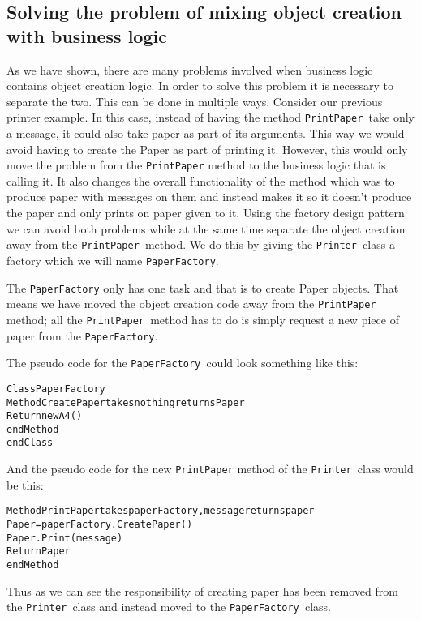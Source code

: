 \subsection*{Solving the problem of mixing object creation with business logic}

As we have shown, there are many problems involved when business logic
contains object creation logic. In order to solve this problem it
is necessary to separate the two. This can be done in multiple ways.
Consider our previous printer example. In this case, instead of having
the method \texttt{PrintPaper }take only a message, it could also
take paper as part of its arguments. This way we would avoid having
to create the Paper as part of printing it. However, this would only
move the problem from the \texttt{PrintPaper} method to the business
logic that is calling it. It also changes the overall functionality
of the method which was to produce paper with messages on them and
instead makes it so it doesn\textquoteright{}t produce the paper and
only prints on paper given to it. Using the factory design pattern
we can avoid both problems while at the same time separate the object
creation away from the \texttt{PrintPaper }method. We do this by giving
the \texttt{Printer }class a factory which we will name \texttt{PaperFactory}.

The \texttt{PaperFactory} only has one task and that is to create
Paper objects. That means we have moved the object creation code away
from the \texttt{PrintPaper }method; all the \texttt{PrintPaper }method
has to do is simply request a new piece of paper from the \texttt{PaperFactory}.

The pseudo code for the \texttt{PaperFactory }could look something
like this:

\begin{alltt}
Class PaperFactory 	
    Method CreatePaper takes nothing returns Paper
        Return new A4() 
    endMethod 
endClass
\end{alltt}

And the pseudo code for the new \texttt{PrintPaper} method of the
\texttt{Printer }class would be this:

\begin{alltt}
Method PrintPaper takes paperFactory, message returns paper
    Paper = paperFactory.CreatePaper()
    Paper.Print(message) 	
    Return Paper 
endMethod	
\end{alltt}

Thus as we can see the responsibility of creating paper has been removed
from the \texttt{Printer }class and instead moved to the \texttt{PaperFactory
}class.


